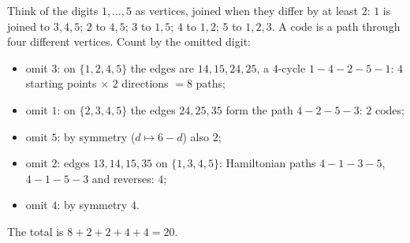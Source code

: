 Think of the digits $1,\dots,5$ as vertices, joined when they differ by at least $2$: $1$ is joined to $3,4,5$; $2$ to $4,5$; $3$ to $1,5$; $4$ to $1,2$; $5$ to $1,2,3$. A code is a path through four different vertices. Count by the omitted digit:
\begin{itemize}
\item omit $3$: on $\{1,2,4,5\}$ the edges are $14,15,24,25$, a $4$-cycle $1\!-\!4\!-\!2\!-\!5\!-\!1$: $4$ starting points $\times$ $2$ directions $=8$ paths;
\item omit $1$: on $\{2,3,4,5\}$ the edges $24,25,35$ form the path $4\!-\!2\!-\!5\!-\!3$: $2$ codes;
\item omit $5$: by symmetry ($d\mapsto6-d$) also $2$;
\item omit $2$: edges $13,14,15,35$ on $\{1,3,4,5\}$: Hamiltonian paths $4\!-\!1\!-\!3\!-\!5$, $4\!-\!1\!-\!5\!-\!3$ and reverses: $4$;
\item omit $4$: by symmetry $4$.
\end{itemize}
The total is $8+2+2+4+4=\boxed{20}$.
